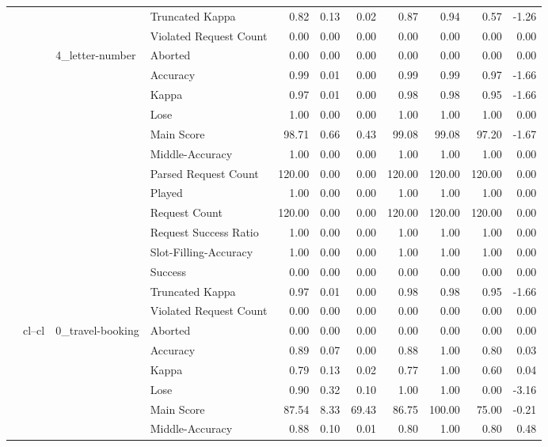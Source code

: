\begin{tabular}{llllrrrrrrr}
 &  &  & Truncated Kappa & 0.82 & 0.13 & 0.02 & 0.87 & 0.94 & 0.57 & -1.26 \\
 &  &  & Violated Request Count & 0.00 & 0.00 & 0.00 & 0.00 & 0.00 & 0.00 & 0.00 \\
\cline{3-11}
 &  & \multirow[t]{14}{*}{4_letter-number} & Aborted & 0.00 & 0.00 & 0.00 & 0.00 & 0.00 & 0.00 & 0.00 \\
 &  &  & Accuracy & 0.99 & 0.01 & 0.00 & 0.99 & 0.99 & 0.97 & -1.66 \\
 &  &  & Kappa & 0.97 & 0.01 & 0.00 & 0.98 & 0.98 & 0.95 & -1.66 \\
 &  &  & Lose & 1.00 & 0.00 & 0.00 & 1.00 & 1.00 & 1.00 & 0.00 \\
 &  &  & Main Score & 98.71 & 0.66 & 0.43 & 99.08 & 99.08 & 97.20 & -1.67 \\
 &  &  & Middle-Accuracy & 1.00 & 0.00 & 0.00 & 1.00 & 1.00 & 1.00 & 0.00 \\
 &  &  & Parsed Request Count & 120.00 & 0.00 & 0.00 & 120.00 & 120.00 & 120.00 & 0.00 \\
 &  &  & Played & 1.00 & 0.00 & 0.00 & 1.00 & 1.00 & 1.00 & 0.00 \\
 &  &  & Request Count & 120.00 & 0.00 & 0.00 & 120.00 & 120.00 & 120.00 & 0.00 \\
 &  &  & Request Success Ratio & 1.00 & 0.00 & 0.00 & 1.00 & 1.00 & 1.00 & 0.00 \\
 &  &  & Slot-Filling-Accuracy & 1.00 & 0.00 & 0.00 & 1.00 & 1.00 & 1.00 & 0.00 \\
 &  &  & Success & 0.00 & 0.00 & 0.00 & 0.00 & 0.00 & 0.00 & 0.00 \\
 &  &  & Truncated Kappa & 0.97 & 0.01 & 0.00 & 0.98 & 0.98 & 0.95 & -1.66 \\
 &  &  & Violated Request Count & 0.00 & 0.00 & 0.00 & 0.00 & 0.00 & 0.00 & 0.00 \\
\cline{2-11} \cline{3-11}
 & \multirow[t]{70}{*}{cl--cl} & \multirow[t]{14}{*}{0_travel-booking} & Aborted & 0.00 & 0.00 & 0.00 & 0.00 & 0.00 & 0.00 & 0.00 \\
 &  &  & Accuracy & 0.89 & 0.07 & 0.00 & 0.88 & 1.00 & 0.80 & 0.03 \\
 &  &  & Kappa & 0.79 & 0.13 & 0.02 & 0.77 & 1.00 & 0.60 & 0.04 \\
 &  &  & Lose & 0.90 & 0.32 & 0.10 & 1.00 & 1.00 & 0.00 & -3.16 \\
 &  &  & Main Score & 87.54 & 8.33 & 69.43 & 86.75 & 100.00 & 75.00 & -0.21 \\
 &  &  & Middle-Accuracy & 0.88 & 0.10 & 0.01 & 0.80 & 1.00 & 0.80 & 0.48 \\

\end{tabular}
